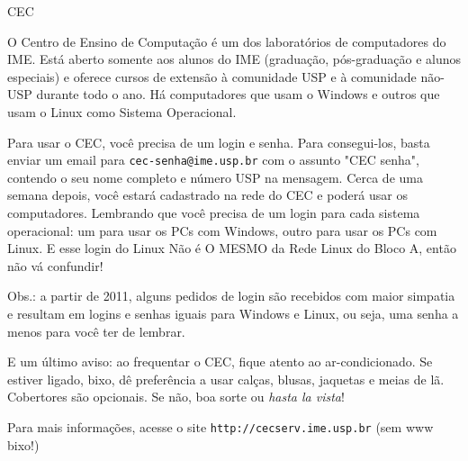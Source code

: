 \begin{secao}{CEC}

O Centro de Ensino de Computação é um dos laboratórios de computadores do IME. Está
aberto somente aos alunos do IME (graduação, pós-graduação e alunos especiais)
e oferece cursos de extensão à comunidade USP e à comunidade não-USP durante
todo o ano. Há computadores que usam o Windows e outros que usam o Linux como
Sistema Operacional.

Para usar o CEC, você precisa de um login e senha. Para consegui-los, basta
enviar um email para {\tt cec-senha@ime.usp.br} com o assunto "CEC senha",
contendo o seu nome completo e número USP na mensagem. Cerca de uma
semana depois, você estará cadastrado na rede do CEC e poderá usar os
computadores. Lembrando que você precisa de um login para cada sistema
operacional: um para usar os PCs com Windows, outro para usar os PCs com Linux.
E esse login do Linux Não é O MESMO da Rede Linux do Bloco A, então não vá
confundir!


Obs.: a partir de 2011, alguns pedidos de login são recebidos com maior simpatia e
resultam em logins e senhas iguais para Windows e Linux, ou seja, uma senha a
menos para você ter de lembrar.

E um último aviso: ao frequentar o CEC, fique atento ao ar-condicionado. Se
estiver ligado, bixo, dê preferência a usar calças, blusas, jaquetas e meias de
lã. Cobertores são opcionais. Se não, boa sorte ou \textit{hasta la vista}!

Para mais informações, acesse o site {\tt http://cecserv.ime.usp.br} (sem www bixo!)
\end{secao}
